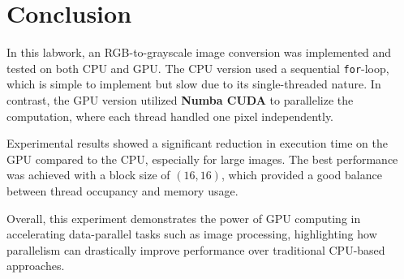 \documentclass[a4paper,12pt]{article}
\begin{document}
\section*{Conclusion}

In this labwork, an RGB-to-grayscale image conversion was implemented and tested on both CPU and GPU.
The CPU version used a sequential \texttt{for}-loop, which is simple to implement but slow due to its single-threaded nature.
In contrast, the GPU version utilized \textbf{Numba CUDA} to parallelize the computation, where each thread handled one pixel independently.

Experimental results showed a significant reduction in execution time on the GPU compared to the CPU, especially for large images.
The best performance was achieved with a block size of $(16,16)$, which provided a good balance between thread occupancy and memory usage.

Overall, this experiment demonstrates the power of GPU computing in accelerating data-parallel tasks such as image processing,
highlighting how parallelism can drastically improve performance over traditional CPU-based approaches.
\end{document}
